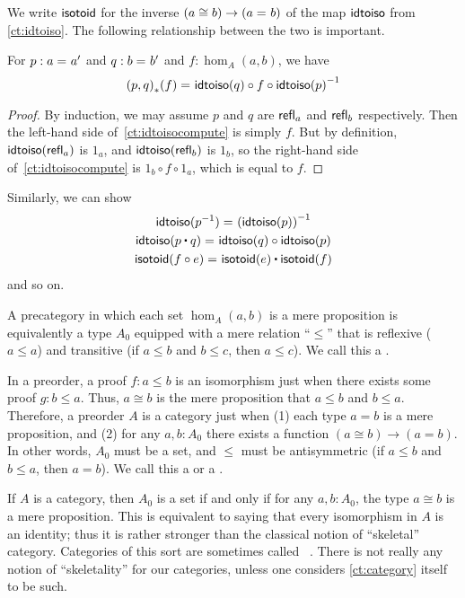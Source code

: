We write $\mathsf{isotoid}$ for the inverse $(a\cong b) \to (a =_{} b)$ of the map $\mathsf{idtoiso}$ from \autoref{ct:idtoiso}.
The following relationship between the two is important.

\begin{lem}\label{ct:idtoiso-trans}
  For $p:a =_{} a'$ and $q:b =_{} b'$ and $f:\hom_A(a,b)$, we have
  \begin{equation}\label{ct:idtoisocompute}
    \id{\trans{(p,q)}{f}}
    {\idtoiso(q)\circ f \circ \inv{\idtoiso(p)}}
  \end{equation}
\end{lem}
\begin{proof}
  By induction, we may assume $p$ and $q$ are $\mathsf{refl}_{a}$ and $\mathsf{refl}_{b}$ respectively.
Then the left-hand side of~\eqref{ct:idtoisocompute} is simply $f$.
  But by definition, $\mathsf{idtoiso}(\mathsf{refl}_{a})$ is $1_a$, and $\mathsf{idtoiso}(\mathsf{refl}_{b})$ is $1_b$, so the right-hand side of~\eqref{ct:idtoisocompute} is $1_b\circ f\circ 1_a$, which is equal to $f$.
\end{proof}

Similarly, we can show
\begin{gather}
  \id{\idtoiso(\rev p)}{\inv {(\idtoiso(p))}}\\
  \id{\idtoiso(p\ct q)}{\idtoiso(q)\circ \idtoiso(p)}\\
  \id{\isotoid(f\circ e)}{\isotoid(e)\ct \isotoid(f)}
\end{gather}
and so on.

\begin{eg}\label{ct:orders}
  A precategory in which each set $\hom_A(a,b)$ is a mere proposition is equivalently a type $A_0$ equipped with a mere relation ``$\le$'' that is reflexive ($a\le a$) and transitive (if $a\le b$ and $b\le c$, then $a\le c$).
  We call this a .

  In a preorder, a proof $f\colon a\le b$ is an isomorphism just when there exists some proof $g\colon b\le a$.
  Thus, $a\cong b$ is the mere proposition that $a\le b$ and $b\le a$.
  Therefore, a preorder $A$ is a category just when (1) each type $a=b$ is a mere proposition, and (2) for any $a,b:A_0$ there exists a function $(a\cong b) \to (a=b)$.
  In other words, $A_0$ must be a set, and $\le$ must be antisymmetric (if $a\le b$ and $b\le a$, then $a=b$).
  We call this a  or a .
\end{eg}

\begin{eg}\label{ct:gaunt}
  If $A$ is a category, then $A_0$ is a set if and only if for any $a,b:A_0$, the type $a\cong b$ is a mere proposition.
  This is equivalent to saying that every isomorphism in $A$ is an identity; thus it is rather stronger than the classical notion of ``skeletal'' category.
  Categories of this sort are sometimes called ~\cite{bsp12infncats}.
  There is not really any notion of ``skeletality'' for our categories, unless one considers \autoref{ct:category} itself to be such.
\end{eg}

